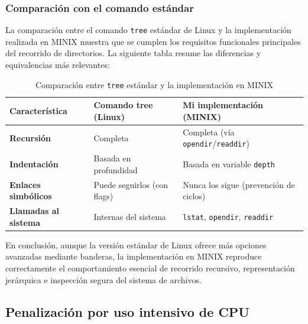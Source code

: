 \documentclass[12pt,spanish]{article}
\begin{document}
\FloatBarrier

\newpage
\subsubsection*{Comparación con el comando estándar}


La comparación entre el comando \texttt{tree} estándar de Linux y la implementación realizada en MINIX muestra que se cumplen los requisitos funcionales principales del recorrido de directorios. La siguiente tabla resume las diferencias y equivalencias más relevantes:

\begin{table}[H]
    \centering
    \renewcommand{\arraystretch}{1.2}
    \begin{tabular}{|p{}|p{}|p{}|}
        \hline
        \textbf{Característica} & \textbf{Comando tree (Linux)} & \textbf{Mi implementación (MINIX)} \\
        \hline
        \textbf{Recursión} & Completa & Completa (vía \texttt{opendir}/\texttt{readdir}) \\
        \hline
        \textbf{Indentación} & Basada en profundidad & Basada en variable \texttt{depth} \\
        \hline
        \textbf{Enlaces simbólicos} & Puede seguirlos (con flags) & Nunca los sigue (prevención de ciclos) \\
        \hline
        \textbf{Llamadas al sistema} & Internas del sistema & \texttt{lstat}, \texttt{opendir}, \texttt{readdir} \\
        \hline
    \end{tabular}
    \caption{Comparación entre \texttt{tree} estándar y la implementación en MINIX}
\end{table}

En conclusión, aunque la versión estándar de Linux ofrece más opciones avanzadas mediante banderas, la implementación en MINIX reproduce correctamente el comportamiento esencial de recorrido recursivo, representación jerárquica e inspección segura del sistema de archivos.

\subsection{Penalización por uso intensivo de CPU}
\end{document}
